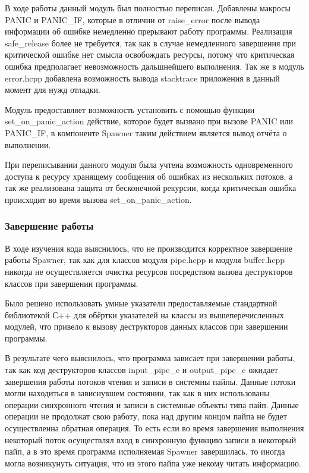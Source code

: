 \documentclass{imcs}
\begin{document}
В ходе работы данный модуль был полностью переписан. Добавлены макросы PANIC и PANIC\_IF, которые в отличии от raise\_error после вывода информации об ошибке немедленно прерывают работу программы. Реализация safe\_release более не требуется, так как в случае немедленного завершения при критической ошибке нет смысла освобождать ресурсы, потому что критическая ошибка предполагает невозможность дальшнейшего выполнения. Так же в модуль error.h\/cpp добавлена возможность вывода stacktrace приложения в данный момент для нужд отладки.

Модуль предоставляет возможность установить с помощью функции \\set\_on\_panic\_action действие, которое будет вызвано при вызове PANIC или PANIC\_IF, в компоненте Spawner таким действием является вывод отчёта о выполнении.

При переписывании данного модуля была учтена возможность одновременного доступа к ресурсу хранящему сообщения об ошибках из нескольких потоков, а так же реализована защита от бесконечной рекурсии, когда критическая ошибка происходит во время вызова set\_on\_panic\_action.

\subsubsection{Завершение работы}
В ходе изучения кода выяснилось, что не производится корректное завершение работы Spawner, так как для классов модуля pipe.h\/cpp и модуля buffer.h\/cpp никогда не осуществляется очистка ресурсов посредством вызова деструкторов классов при завершении программы.

Было решено использовать умные указатели предоставляемые стандартной библиотекой С++ для обёртки указателей на классы из вышеперечисленных модулей, что привело к вызову деструкторов данных классов при завершении программы.

В результате чего выяснилось, что программа зависает при завершении работы, так как код деструкторов классов input\_pipe\_c и output\_pipe\_c ожидает завершения работы потоков чтения и записи в системны пайпы. Данные потоки могли находиться в зависнувшем состоянии, так как в них использованы операции синхронного чтения и записи в системные объекты типа пайп. Данные операции не продолжат свою работу, пока над другим концом пайпа не будет осуществленна обратная операция. То есть если во время завершения выполнения некоторый поток осуществлял вход в синхронную функцию записи в некоторый пайп, а в это время программа исполняемая Spawner завершилась, то иногда могла возникунуть ситуация, что из этого пайпа уже некому читать информацию.
\end{document}

